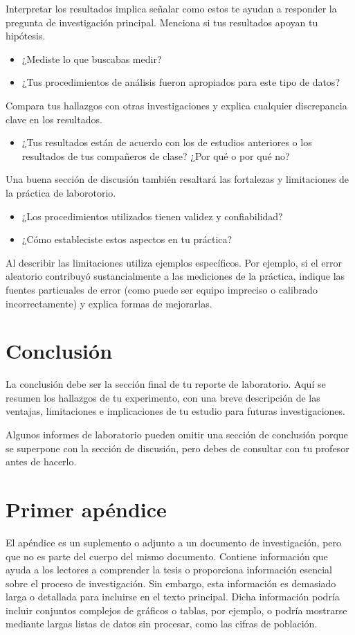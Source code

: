 \documentclass{replab}
\begin{document}
	Interpretar los resultados implica señalar como estos te ayudan a responder la pregunta de investigación principal. Menciona si tus resultados apoyan tu hipótesis.
	\begin{itemize}
		\item ¿Mediste lo que buscabas medir?
		\item ¿Tus procedimientos de análisis fueron apropiados para este tipo de datos?
	\end{itemize}

	Compara tus hallazgos con otras investigaciones y explica cualquier discrepancia clave en los resultados.
	\begin{itemize}
		\item ¿Tus resultados están de acuerdo con los de estudios anteriores o los resultados de tus compañeros de clase? ¿Por qué o por qué no?
	\end{itemize}

	Una buena sección de discusión también resaltará las fortalezas y limitaciones de la práctica de laborotorio.
	\begin{itemize}
		\item ¿Los procedimientos utilizados tienen validez y confiabilidad?
		\item ¿Cómo estableciste estos aspectos en tu práctica?
	\end{itemize}

	Al describir las limitaciones utiliza ejemplos específicos. Por ejemplo, si el error aleatorio contribuyó sustancialmente a las mediciones de la práctica, indique las fuentes particuales de error (como puede ser equipo impreciso o calibrado incorrectamente) y explica formas de mejorarlas.

	\section{Conclusión}

	La conclusión debe ser la sección final de tu reporte de laboratorio. Aquí se resumen los hallazgos de tu experimento, con una breve descripción de las ventajas, limitaciones e implicaciones de tu estudio para futuras investigaciones.

	Algunos informes de laboratorio pueden omitir una sección de conclusión porque se superpone con la sección de discusión, pero debes de consultar con tu profesor antes de hacerlo.

	\appendix

	\section{Primer apéndice}

	El apéndice es un suplemento o adjunto a un documento de investigación, pero que no es parte del cuerpo del mismo documento. Contiene información que ayuda a los lectores a comprender la tesis o proporciona información esencial sobre el proceso de investigación. Sin embargo, esta información es demasiado larga o detallada para incluirse en el texto principal. Dicha información podría incluir conjuntos complejos de gráficos o tablas, por ejemplo, o podría mostrarse mediante largas listas de datos sin procesar, como las cifras de población.
	
	\printbibliography[heading=bibintoc]
	
\end{document}
